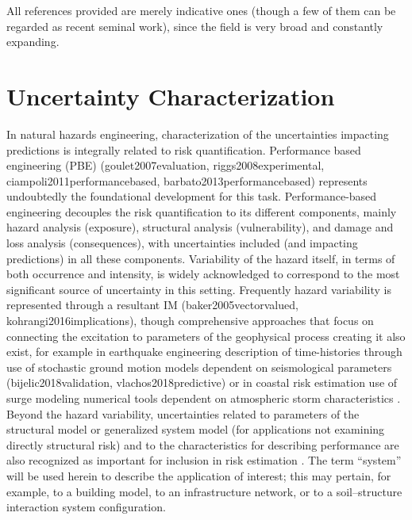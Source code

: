 All references provided are merely indicative ones (though a few of them can be regarded as recent seminal work), since the field is very broad and constantly expanding.

\section{Uncertainty Characterization}
\label{sec:uq_characterization}

In natural hazards engineering, characterization of the uncertainties impacting predictions is integrally related to risk quantification. Performance based engineering (PBE) (goulet2007evaluation, riggs2008experimental, ciampoli2011performancebased, barbato2013performancebased) represents undoubtedly the foundational development for this task. Performance-based engineering decouples the risk quantification to its different components, mainly hazard analysis (exposure), structural analysis (vulnerability), and damage and loss analysis (consequences), with uncertainties included (and impacting predictions) in all these components. Variability of the hazard itself, in terms of both occurrence and intensity, is widely acknowledged to correspond to the most significant source of uncertainty in this setting. Frequently hazard variability is represented through a resultant IM (baker2005vectorvalued, kohrangi2016implications), though comprehensive approaches that focus on connecting the excitation to parameters of the geophysical process creating it also exist, for example in earthquake engineering description of time-histories through use of stochastic ground motion models dependent on seismological parameters (bijelic2018validation, vlachos2018predictive) or in coastal risk estimation use of surge modeling numerical tools dependent on atmospheric storm characteristics \citep{resio2007white}. Beyond the hazard variability, uncertainties related to parameters of the structural model or generalized system model (for applications not examining directly structural risk) and to the characteristics for describing performance are also recognized as important for inclusion in risk estimation \citep{porter2002sensitivity}. The term “system” will be used herein to describe the application of interest; this may pertain, for example, to a building model, to an infrastructure network, or to a soil–structure interaction system configuration. 

